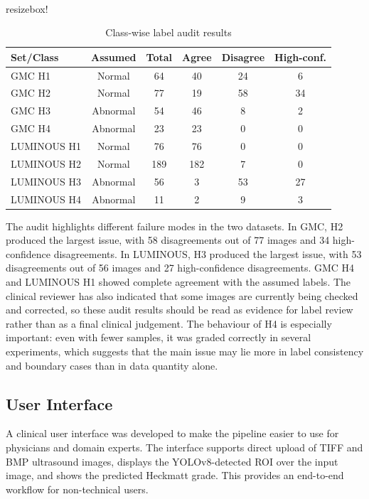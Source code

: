 \begin{table}[H]
\centering
\scriptsize
\\resizebox{\textwidth}{!}{%
\begin{tabular}{lccccc}
\toprule
\textbf{Set/Class} & \textbf{Assumed} & \textbf{Total} & \textbf{Agree} & \textbf{Disagree} & \textbf{High-conf.} \\
\midrule
GMC H1 & Normal & 64 & 40 & 24 & 6 \\
GMC H2 & Normal & 77 & 19 & 58 & 34 \\
GMC H3 & Abnormal & 54 & 46 & 8 & 2 \\
GMC H4 & Abnormal & 23 & 23 & 0 & 0 \\
LUMINOUS H1 & Normal & 76 & 76 & 0 & 0 \\
LUMINOUS H2 & Normal & 189 & 182 & 7 & 0 \\
LUMINOUS H3 & Abnormal & 56 & 3 & 53 & 27 \\
LUMINOUS H4 & Abnormal & 11 & 2 & 9 & 3 \\
\bottomrule
\end{tabular}}
\caption{Class-wise label audit results}
\label{tab:audit_classwise}
\end{table}

The audit highlights different failure modes in the two datasets. In GMC, H2 produced the largest issue, with 58 disagreements out of 77 images and 34 high-confidence disagreements. In LUMINOUS, H3 produced the largest issue, with 53 disagreements out of 56 images and 27 high-confidence disagreements. GMC H4 and LUMINOUS H1 showed complete agreement with the assumed labels. The clinical reviewer has also indicated that some images are currently being checked and corrected, so these audit results should be read as evidence for label review rather than as a final clinical judgement. The behaviour of H4 is especially important: even with fewer samples, it was graded correctly in several experiments, which suggests that the main issue may lie more in label consistency and boundary cases than in data quantity alone.

\subsection{User Interface}
A clinical user interface was developed to make the pipeline easier to use for physicians and domain experts. The interface supports direct upload of TIFF and BMP ultrasound images, displays the YOLOv8-detected ROI over the input image, and shows the predicted Heckmatt grade. This provides an end-to-end workflow for non-technical users.

